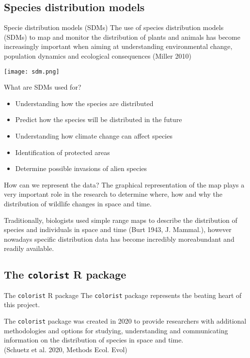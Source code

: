 \documentclass{beamer}
\begin{document}
\subsection{Species distribution models}
\begin{frame}{Specie distribution models (SDMs)}
   \centering
   The use of species distribution models (SDMs) to map and monitor the distribution of plants and animals has become increasingly important when aiming at understanding environmental change, population dynamics and ecological consequences
\textcolor{unibo}{(Miller 2010)}
\bigskip

\texttt{[image: sdm.png]}
\end{frame}
\begin{frame}{What are SDMs used for?}
    \begin{itemize}
        \item Understanding how the species are distributed \pause
        \item Predict how the species will be distributed in the future  \pause
        \item Understanding how climate change can affect species  \pause
        \item Identification of protected areas  \pause
        \item Determine possible invasions of alien species
    \end{itemize}
    
\end{frame}
\begin{frame}{How can we represent the data?}
    The graphical representation of the map plays a very important role in the research
to determine where, how and why the distribution of wildlife changes in space and time.
\bigskip

Traditionally, biologists used simple range maps to describe the distribution of species and individuals in space and time \textcolor{unibo}{(Burt 1943, J. Mammal.)}, however nowadays specific distribution data has become incredibly moreabundant and readily available.
\end{frame}





\subsection{The \texttt{colorist} R package}
\begin{frame}{The \texttt{colorist} R package}
\centering
    The \texttt{colorist} package represents the beating heart of this project.
    \bigskip
    
    The \texttt{colorist} package was created in 2020 to provide researchers with additional methodologies and options for studying, understanding and communicating information on the distribution of species in space and time. \\ 
    \textcolor{unibo}{(Schuetz et al. 2020, Methods Ecol. Evol)}
\end{frame}
\end{document}
